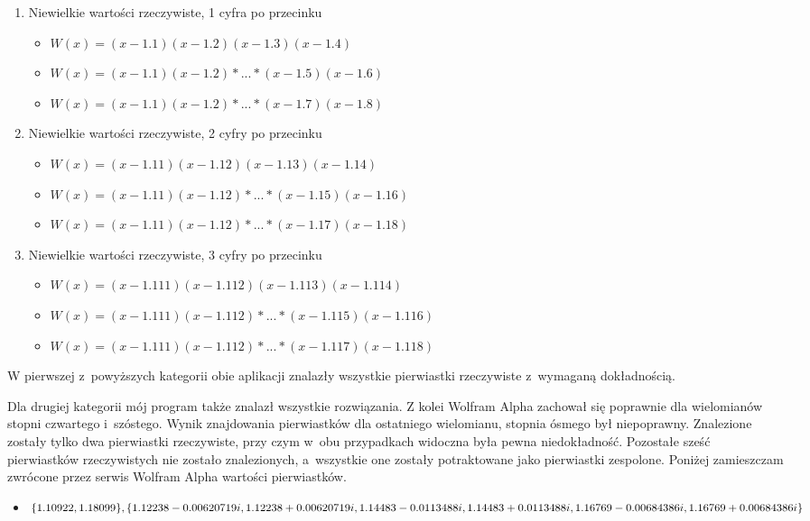 \begin{enumerate}
	\item Niewielkie wartości rzeczywiste, 1 cyfra po przecinku
	\begin{itemize}
		\item $W(x)=(x-1.1)(x-1.2)(x-1.3)(x-1.4)$
		\item $W(x)=(x-1.1)(x-1.2)*...*(x-1.5)(x-1.6)$
		\item $W(x)=(x-1.1)(x-1.2)*...*(x-1.7)(x-1.8)$
	\end{itemize}
	\item Niewielkie wartości rzeczywiste, 2 cyfry po przecinku
	\begin{itemize}
		\item $W(x)=(x-1.11)(x-1.12)(x-1.13)(x-1.14)$
		\item $W(x)=(x-1.11)(x-1.12)*...*(x-1.15)(x-1.16)$
		\item $W(x)=(x-1.11)(x-1.12)*...*(x-1.17)(x-1.18)$
	\end{itemize}
	\item Niewielkie wartości rzeczywiste, 3 cyfry po przecinku
	\begin{itemize}
		\item $W(x)=(x-1.111)(x-1.112)(x-1.113)(x-1.114)$
		\item $W(x)=(x-1.111)(x-1.112)*...*(x-1.115)(x-1.116)$
		\item $W(x)=(x-1.111)(x-1.112)*...*(x-1.117)(x-1.118)$
	\end{itemize}
\end{enumerate}

W pierwszej z~powyższych kategorii obie aplikacji znalazły wszystkie pierwiastki rzeczywiste z~wymaganą dokładnością.

Dla drugiej kategorii mój program także znalazł wszystkie rozwiązania. Z kolei Wolfram Alpha zachował się poprawnie dla wielomianów stopni czwartego i~szóstego. Wynik znajdowania pierwiastków dla ostatniego wielomianu, stopnia ósmego był niepoprawny. Znalezione zostały tylko dwa pierwiastki rzeczywiste, przy czym w~obu przypadkach widoczna była pewna niedokładność. Pozostałe sześć pierwiastków rzeczywistych nie zostało znalezionych, a~wszystkie one zostały potraktowane jako pierwiastki zespolone. Poniżej zamieszczam zwrócone przez serwis Wolfram Alpha wartości pierwiastków.

\begin{itemize}
	\item $\{1.10922, 1.18099\}, \{1.12238-0.00620719i, 1.12238+0.00620719i, \\
	1.14483-0.0113488i, 1.14483+0.0113488i, 1.16769-0.00684386 i, 1.16769+0.00684386i\}$
\end{itemize}

